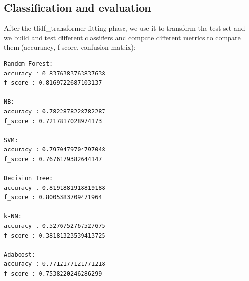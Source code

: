 \documentclass[a4paper]{article}
\begin{document}
\subsection{Classification and evaluation}
After the tfidf\_transformer fitting phase, we use it to transform the test set and we build and test different classifiers and compute different metrics to compare them (accurancy, f-score, confusion-matrix):
\begin{verbatim}
Random Forest:
accuracy : 0.8376383763837638
f_score : 0.8169722687103137

NB:
accuracy : 0.7822878228782287
f_score : 0.7217817028974173

SVM:
accuracy : 0.7970479704797048
f_score : 0.7676179382644147

Decision Tree:
accuracy : 0.8191881918819188
f_score : 0.8005383709471964

k-NN:
accuracy : 0.5276752767527675
f_score : 0.38181323539413725

Adaboost:
accuracy : 0.7712177121771218
f_score : 0.7538220246286299
\end{verbatim}
\end{document}
